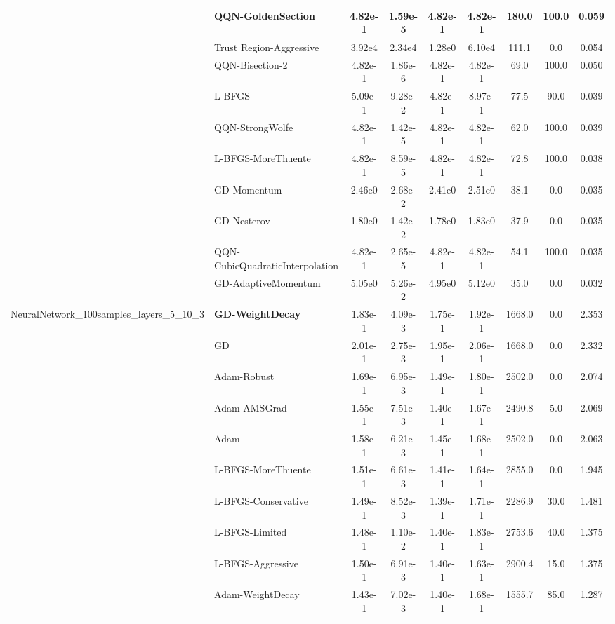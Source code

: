 \documentclass{article}
\begin{document}
\begin{longtable}{|l|l|c|c|c|c|c|c|c|}
\hline
 & QQN-GoldenSection & 4.82e-1 & 1.59e-5 & 4.82e-1 & 4.82e-1 & 180.0 & 100.0 & 0.059 \\
\hline
 & Trust Region-Aggressive & 3.92e4 & 2.34e4 & 1.28e0 & 6.10e4 & 111.1 & 0.0 & 0.054 \\
\hline
 & QQN-Bisection-2 & 4.82e-1 & 1.86e-6 & 4.82e-1 & 4.82e-1 & 69.0 & 100.0 & 0.050 \\
\hline
 & L-BFGS & 5.09e-1 & 9.28e-2 & 4.82e-1 & 8.97e-1 & 77.5 & 90.0 & 0.039 \\
\hline
 & QQN-StrongWolfe & 4.82e-1 & 1.42e-5 & 4.82e-1 & 4.82e-1 & 62.0 & 100.0 & 0.039 \\
\hline
 & L-BFGS-MoreThuente & 4.82e-1 & 8.59e-5 & 4.82e-1 & 4.82e-1 & 72.8 & 100.0 & 0.038 \\
\hline
 & GD-Momentum & 2.46e0 & 2.68e-2 & 2.41e0 & 2.51e0 & 38.1 & 0.0 & 0.035 \\
\hline
 & GD-Nesterov & 1.80e0 & 1.42e-2 & 1.78e0 & 1.83e0 & 37.9 & 0.0 & 0.035 \\
\hline
 & QQN-CubicQuadraticInterpolation & 4.82e-1 & 2.65e-5 & 4.82e-1 & 4.82e-1 & 54.1 & 100.0 & 0.035 \\
\hline
 & GD-AdaptiveMomentum & 5.05e0 & 5.26e-2 & 4.95e0 & 5.12e0 & 35.0 & 0.0 & 0.032 \\
NeuralNetwork\_100samples\_layers\_5\_10\_3 & \textbf{GD-WeightDecay} & 1.83e-1 & 4.09e-3 & 1.75e-1 & 1.92e-1 & 1668.0 & 0.0 & 2.353 \\
\hline
 & GD & 2.01e-1 & 2.75e-3 & 1.95e-1 & 2.06e-1 & 1668.0 & 0.0 & 2.332 \\
\hline
 & Adam-Robust & 1.69e-1 & 6.95e-3 & 1.49e-1 & 1.80e-1 & 2502.0 & 0.0 & 2.074 \\
\hline
 & Adam-AMSGrad & 1.55e-1 & 7.51e-3 & 1.40e-1 & 1.67e-1 & 2490.8 & 5.0 & 2.069 \\
\hline
 & Adam & 1.58e-1 & 6.21e-3 & 1.45e-1 & 1.68e-1 & 2502.0 & 0.0 & 2.063 \\
\hline
 & L-BFGS-MoreThuente & 1.51e-1 & 6.61e-3 & 1.41e-1 & 1.64e-1 & 2855.0 & 0.0 & 1.945 \\
\hline
 & L-BFGS-Conservative & 1.49e-1 & 8.52e-3 & 1.39e-1 & 1.71e-1 & 2286.9 & 30.0 & 1.481 \\
\hline
 & L-BFGS-Limited & 1.48e-1 & 1.10e-2 & 1.40e-1 & 1.83e-1 & 2753.6 & 40.0 & 1.375 \\
\hline
 & L-BFGS-Aggressive & 1.50e-1 & 6.91e-3 & 1.40e-1 & 1.63e-1 & 2900.4 & 15.0 & 1.375 \\
\hline
 & Adam-WeightDecay & 1.43e-1 & 7.02e-3 & 1.40e-1 & 1.68e-1 & 1555.7 & 85.0 & 1.287 \\

\end{longtable}
\end{document}
